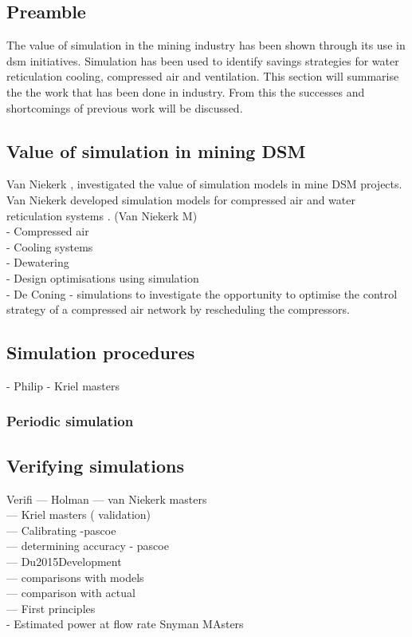 	\subsection{Preamble}
	The value of simulation in  the mining industry has been shown through its use in \gls{dsm} initiatives. Simulation has been used to identify savings strategies for water reticulation cooling, compressed air and ventilation. This section will summarise the the work that has been done in industry. From this the successes and shortcomings of previous work will be discussed.
	\subsection{Value of simulation in mining DSM}
	Van Niekerk \cite{van2013value},\cite{vanNiekerk2012Value} investigated the value of simulation models in mine DSM projects. Van Niekerk developed simulation models for compressed air and water reticulation systems . 
		(Van Niekerk M)\\
		- Compressed air \\
		- Cooling systems\\
		- Dewatering\\
		- Design optimisations using simulation\\
		- De Coning -  simulations to investigate the opportunity to optimise the control strategy of a compressed air network by rescheduling the compressors.
	\subsection{Simulation procedures}
		- Philip
		- Kriel masters\\
		\subsubsection{Periodic simulation}
 	\subsection{Verifying simulations}
 	Verifi
 		— Holman
 		— van Niekerk masters\\
 		— Kriel masters ( validation)\\
 		— Calibrating -pascoe\\
 		— determining accuracy - pascoe\\
 		— Du2015Development\\
 		— comparisons with models\\
 		— comparison with actual \\
 		— First principles\\
 		- Estimated power at flow rate  Snyman MAsters
\clearpage	
